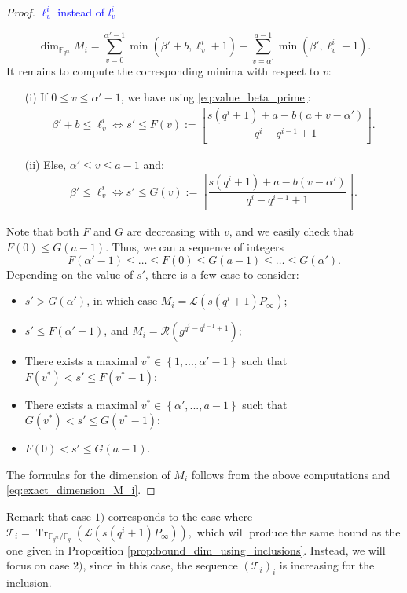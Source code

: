 \documentclass[a4paper]{article}
\theoremstyle{definition}
\theoremstyle{remark}
\newcommand{\calL}{\mathcal{L}}
\newcommand{\calR}{\mathcal{R}}
\newcommand{\calT}{\mathcal{T}}
\newcommand{\fqm}{\mathbb{F}_{q^m}}
\newcommand{\fq}{\mathbb{F}_{q}}
\newcommand{\Tr}[1]{\operatorname{Tr}_{\mathbb{F}_{q^m}/\fq}\left(#1\right)}
\newcommand{\set}[1]{\left\{#1\right\}}
\newcommand\sabira[1]{\textcolor{blue}{#1}}
\begin{document}
\begin{proof}
\sabira{$\ell^i_v$ instead of $l^i_v$}

\begin{equation} \label{eq:exact_dimension_M_i}
\dim_{\fqm} M_i = \sum\limits_{v=0}^{\alpha'-1} \min(\beta'+b,\ell_v^i+1) + \sum\limits_{v=\alpha'}^{a-1} \min(\beta',\ell_v^i+1).
\end{equation}
It remains to compute the corresponding minima with respect to $v$:
\begin{itemize}
    \item[(i)] If $0 \leq v \leq \alpha'-1$, we have using \eqref{eq:value_beta_prime}:
    \begin{align*}
        \beta'+b \leq \ell_v^i \iff s' \leq F(v) := \left\lfloor \dfrac{s(q^i+1)+a-b(a+v-\alpha')}{q^i-q^{i-1}+1}\right\rfloor.
    \end{align*}
    \item[(ii)] Else, $\alpha' \leq v \leq a-1$ and:
    \begin{align*}
        \beta' \leq \ell_v^i \iff s' \leq G(v) := \left\lfloor \dfrac{s(q^i+1)+a-b(v-\alpha')}{q^i-q^{i-1}+1}\right\rfloor .
    \end{align*}
\end{itemize}
Note that both $F$ and $G$ are decreasing with $v$, and we easily check that $F(0) \leq G(a-1)$. Thus, we can a sequence of integers
$$F(\alpha'-1) \leq \dots \leq F(0) \leq G(a-1) \leq \dots \leq G(\alpha').$$
Depending on the value of $s'$, there is a few case to consider:
\begin{itemize}
    \item $s' >G(\alpha')$, in which case $M_i = \calL(s(q^i+1)P_\infty)$;
    \item $s' \leq F(\alpha'-1)$, and $M_i = \calR(g^{q^i-q^{i-1}+1})$;
    \item There exists a maximal $v^* \in \set{1,...,\alpha'-1}$ such that $F(v^*) < s' \leq F(v^*-1)$;
    \item There exists a maximal $v^* \in \set{\alpha',...,a-1}$ such that $G(v^*) < s' \leq G(v^*-1)$;
    \item $F(0) < s' \leq G(a-1)$.
\end{itemize}
The formulas for the dimension of $M_i$ follows from the above computations and \eqref{eq:exact_dimension_M_i}.
\end{proof}

Remark that case $1)$ corresponds to the case where $\calT_i = \Tr{\calL(s(q^i+1)P_\infty)}, $ which will produce the same bound as the one given in Proposition \ref{prop:bound_dim_using_inclusions}.
Instead, we will focus on case $2)$, since in this case, the sequence $(\calT_i)_i$ is increasing for the inclusion. 
\end{document}
